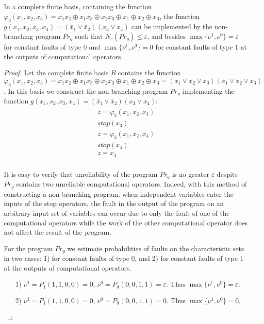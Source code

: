 \documentclass[
11pt,%
tightenlines,%
twoside,%
onecolumn,%
nofloats,%
nobibnotes,%
nofootinbib,%
superscriptaddress,%
noshowpacs,%
centertags]%
{revtex4}
\begin{document}
\begin{lemma}\label{l4}
In a complete finite basis, containing the function
$\varphi_3(x_1, x_2, x_3)=x_1 x_2\oplus x_1 x_3 \oplus x_2 x_3 \oplus
x_1 \oplus x_2 \oplus x_3$, the function $g(x_1, x_2, x_3, x_4)= (\bar{x}_1\vee \bar{x}_2)  (x_3\vee x_4)$ can be implemented by the non-branching program $Pr_g$ such that $N_\varepsilon(Pr_g)\leq \varepsilon$, and besides $\max\{\nu^1, \nu^0\}=\varepsilon$ for constant faults of type $0$ and $\max\{\nu^1, \nu^0\}=0$ for constant faults of type $1$ at the outputs of computational operators.
\end{lemma}

\begin{proof}
Let the complete finite basis $B$ contains the function $\varphi_3(x_1, x_2, x_3)=x_1 x_2\oplus x_1 x_3 \oplus x_2 x_3 \oplus x_1 \oplus x_2 \oplus x_3=(x_1\vee x_2\vee x_3)(\bar{x}_1\vee\bar{x}_2\vee\bar{x}_3)$. In this basis we construct the non-branching program $Pr_g$ implementing the function $g(x_1, x_2, x_3, x_4)= (\bar{x}_1\vee \bar{x}_2)  (x_3\vee x_4)$:
\begin{eqnarray*}
\begin{array}{l}
  z=\varphi_3(x_1, x_2, x_3) \\
  stop(x_3) \\
  z=\varphi_3(x_1, x_2, x_4) \\
  stop(x_4) \\
  z=x_4 \\
\end{array}
\end{eqnarray*}

It is easy to verify that unreliability of the program $Pr_g$ is no greater $\varepsilon$ despite $Pr_g$ contains two unreliable computational operators. Indeed, with this method of constructing a non-branching program, when independent variables enter the inputs of the stop operators, the fault in the output of the program on an arbitrary input set of variables can occur due to only the fault of one of the computational operators while the work of the other computational operator does not affect the result of the program.

For the program $Pr_g$ we estimate probabilities of faults on  the
characteristic sets in two cases: 1) for constant faults of type 0,
and 2) for constant faults of type 1 at the outputs of computational
operators.
\begin{itemize}
\item[1)] $\nu^1=P_1(1, 1, 0, 0)=0$,  $\nu^0=P_0(0, 0, 1, 1)=\varepsilon$. Thus $\max\{\nu^1, \nu^0\}=\varepsilon$.
\item[2)] $\nu^1=P_1(1, 1, 0, 0)=0$,  $\nu^0=P_0(0, 0, 1, 1)=0$. Thus $\max\{\nu^1, \nu^0\}=0$.
\end{itemize}

\end{proof}
\end{document}
